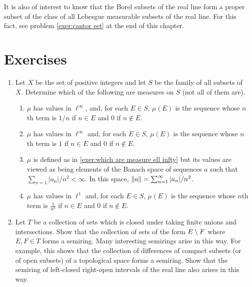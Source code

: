 It is also of interest to know that the Borel subsets of the real line form a proper subset of the class of all Lebesgue measurable subsets of the real line. For this fact, see problem \ref{exer:cantor set} at the end of this chapter.

\section{Exercises}

\begin{enumerate}[label=\arabic*),ref=\arabic*]
\item \label{exer:ex of measures}
Let $X$ be the set of positive integers and let $S$ be the family of all subsets of $X$. Determine which of the following are measures on $S$ (not all of them are).
\begin{enumerate}[label=\alph*),ref=\alph*)]
    \item $\mu$ has values in $\ell^\infty$, and, for each $E \in S$, $\mu(E)$ is the sequence whose $n$th term is $1 / n$ if $n \in E$ and 0 if $n \notin E$.
    
    \item \label{exer:which are measure ell infty} $\mu$ has values in $\ell^\infty$ and, for each $E \in S$, $\mu(E)$ is the sequence whose $n$th term is $1$ if $n \in E$ and $0$ if $n \notin E$.
    
    \item $\mu$ is defined as in \ref{exer:which are measure ell infty} but its values are viewed as being elements of the Banach space of sequences $a$ such that $\sum_{n=1}|a_n|/n^2<\infty$. In this space, $\norm{a}=\sum_{n=1}^\infty|a_n|/n^2$.
    
    \item $\mu$ has values in $\ell^1$ and, for each $E\in S$, $\mu(E)$ is the sequence whose $n$th term is $\frac1{n^2}$ if $n\in E$ and $0$ if $n\notin E$.
\end{enumerate}

\item Let $T$ be a collection of sets which is closed under taking finite unions and intersections. Show that the collection of sets of the form $E\setminus F$ where $E,F\in T$ forms a semiring. Many interesting semirings arise in this way. For example, this shows that the collection of differences of compact subsets (or of open subsets) of a topological space forms a semiring. Show that the semiring of left-closed right-open intervals of the real line also arises in this way.


\end{enumerate}
